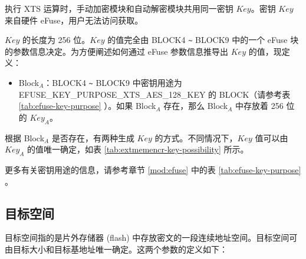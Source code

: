 \documentclass[main\_\_CN.tex]{subfiles}
\begin{document}
执行 XTS 运算时，手动加密模块和自动解密模块共用同一密钥 \begin{math}\mathit{Key}\end{math}。密钥 \begin{math}\mathit{Key}\end{math} 来自硬件 eFuse，用户无法访问获取。

\begin{math}\mathit{Key}\end{math} 的长度为 256 位。\begin{math}\mathit{Key}\end{math} 的值完全由 BLOCK4 \verb+~+ BLOCK9 中的一个 eFuse 块的参数信息决定。为方便阐述如何通过 eFuse 参数信息推导出 \begin{math}\mathit{Key}\end{math} 的值，现定义：
\begin{itemize}
    \item Block$_A$：BLOCK4 \verb+~+ BLOCK9 中密钥用途为 EFUSE\_KEY\_PURPOSE\_XTS\_AES\_128\_KEY 的 BLOCK（请参考表 \ref{tab:efuse-key-purpose} \textit{}）。如果 Block$_A$ 存在，那么 Block$_A$ 中存放着 256 位的 \begin{math}\mathit{Key}_{A}\end{math}。
\end{itemize}

根据 Block$_A$ 是否存在，有两种生成 \begin{math}\mathit{Key}\end{math} 的方式。不同情况下，\begin{math}\mathit{Key}\end{math} 值可以由 \begin{math}\mathit{Key}_{A}\end{math} 的值唯一确定，如表 \ref{tab:extmemencr-key-possibility} 所示。



更多有关密钥用途的信息，请参考章节 \ref{mod:efuse} \textit{} 中的表 \ref{tab:efuse-key-purpose} \textit{}。

\subsection{目标空间} 
\label{sec:extmemencr-target-space}

目标空间指的是片外存储器 (flash) 中存放密文的一段连续地址空间。目标空间可由目标大小和目标基地址唯一确定。这两个参数的定义如下：
\end{document}
